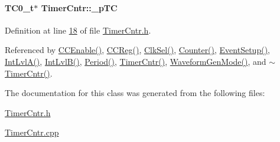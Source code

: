 \hypertarget{class_timer_cntr_ae29c58d2e9059e5b3cff07a26dcc5b91}{
\paragraph[{\_\-pTC}]{\setlength{\rightskip}{0pt plus 5cm}TC0\_\-t$\ast$ {\bf TimerCntr::\_\-pTC}}\hfill}
\label{class_timer_cntr_ae29c58d2e9059e5b3cff07a26dcc5b91}


Definition at line \hyperlink{_timer_cntr_8h_source_l00018}{18} of file \hyperlink{_timer_cntr_8h_source}{TimerCntr.h}.



Referenced by \hyperlink{_timer_cntr_8cpp_source_l00150}{CCEnable()}, \hyperlink{_timer_cntr_8cpp_source_l00200}{CCReg()}, \hyperlink{_timer_cntr_8cpp_source_l00144}{ClkSel()}, \hyperlink{_timer_cntr_8cpp_source_l00178}{Counter()}, \hyperlink{_timer_cntr_8cpp_source_l00162}{EventSetup()}, \hyperlink{_timer_cntr_8cpp_source_l00168}{IntLvlA()}, \hyperlink{_timer_cntr_8cpp_source_l00173}{IntLvlB()}, \hyperlink{_timer_cntr_8cpp_source_l00189}{Period()}, \hyperlink{_timer_cntr_8cpp_source_l00116}{TimerCntr()}, \hyperlink{_timer_cntr_8cpp_source_l00156}{WaveformGenMode()}, and \hyperlink{_timer_cntr_8cpp_source_l00134}{$\sim$TimerCntr()}.



The documentation for this class was generated from the following files:\begin{DoxyCompactItemize}
\item 
\hyperlink{_timer_cntr_8h}{TimerCntr.h}\item 
\hyperlink{_timer_cntr_8cpp}{TimerCntr.cpp}\end{DoxyCompactItemize}

